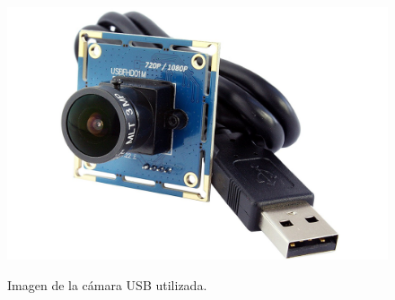 \begin{figure}[H]
  \begin{center}
    \includegraphics[scale=0.15]{imagenes/robot/camara-usb.jpg}\\
    \caption{Imagen de la cámara USB utilizada.}
  \end{center}
\end{figure}
